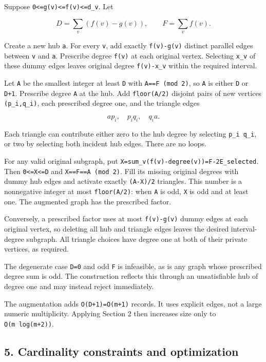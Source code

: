 Suppose \texttt{0\textless{}=g(v)\textless{}=f(v)\textless{}=d\_v}. Let

\[
D=\sum_v(f(v)-g(v)),\qquad F=\sum_v f(v).
\]

Create a new hub \texttt{a}. For every \texttt{v}, add exactly \texttt{f(v)-g(v)} distinct parallel edges between \texttt{v} and \texttt{a}. Prescribe degree \texttt{f(v)} at each original vertex. Selecting \texttt{x\_v} of these dummy edges leaves original degree \texttt{f(v)-x\_v} within the required interval.

Let \texttt{A} be the smallest integer at least \texttt{D} with \texttt{A==F\ (mod\ 2)}, so \texttt{A} is either \texttt{D} or \texttt{D+1}. Prescribe degree \texttt{A} at the hub. Add \texttt{floor(A/2)} disjoint pairs of new vertices \texttt{(p\_i,q\_i)}, each prescribed degree one, and the triangle edges

\[
a p_i,\quad p_i q_i,\quad q_i a.
\]

Each triangle can contribute either zero to the hub degree by selecting \texttt{p\_i\ q\_i}, or two by selecting both incident hub edges. There are no loops.

For any valid original subgraph, put \texttt{X=sum\_v(f(v)-degree(v))=F-2\textbar{}E\_selected\textbar{}}. Then \texttt{0\textless{}=X\textless{}=D} and \texttt{X==F==A\ (mod\ 2)}. Fill its missing original degrees with dummy hub edges and activate exactly \texttt{(A-X)/2} triangles. This number is a nonnegative integer at most \texttt{floor(A/2)}: when \texttt{A} is odd, \texttt{X} is odd and at least one. The augmented graph has the prescribed factor.

Conversely, a prescribed factor uses at most \texttt{f(v)-g(v)} dummy edges at each original vertex, so deleting all hub and triangle edges leaves the desired interval-degree subgraph. All triangle choices have degree one at both of their private vertices, as required.

The degenerate case \texttt{D=0} and odd \texttt{F} is infeasible, as is any graph whose prescribed degree sum is odd. The construction reflects this through an unsatisfiable hub of degree one and may instead reject immediately.

The augmentation adds \texttt{O(D+1)=O(m+1)} records. It uses explicit edges, not a large numeric multiplicity. Applying Section 2 then increases size only to \texttt{O(m\ log(m+2))}.

\hypertarget{af-9f2952a6d0-cardinality-constraints-and-optimization}{%
\subsection{5. Cardinality constraints and optimization}\label{af-9f2952a6d0-cardinality-constraints-and-optimization}}

